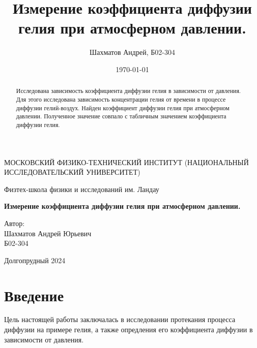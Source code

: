 \documentclass[12pt]{article}
\title{Измерение коэффициента диффузии гелия при атмосферном давлении.}
\author{Шахматов Андрей, Б02-304}
\date{\today}
\begin{document}
\begin{titlepage}
    \begin{center}
        {\large МОСКОВСКИЙ ФИЗИКО-ТЕХНИЧЕСКИЙ ИНСТИТУТ (НАЦИОНАЛЬНЫЙ ИССЛЕДОВАТЕЛЬСКИЙ УНИВЕРСИТЕТ)}
    \end{center}
    \begin{center}
        {\large Физтех-школа физики и исследований им. Ландау}
    \end{center}
    
    
    \vspace{3cm}
    {\huge
        \begin{center}
            \textbf{Измерение коэффициента диффузии гелия при атмосферном давлении.}
        \end{center}
    }
    \vspace{2cm}
    \begin{flushright}
        {\LARGE Автор:\\ Шахматов Андрей Юрьевич \\
            \vspace{0.2cm}
            Б02-304}
    \end{flushright}
    \vspace{7 cm}
    \begin{center}
        Долгопрудный 2024
    \end{center}
\end{titlepage}


\begin{abstract}
    Исследована зависимость коэффициента диффузии гелия в зависимости от давления. Для этого 
    исследована зависимость концентрации гелия от времени в процессе диффузии гелий-воздух. 
    Найден коэффициент диффузии гелия при атмосферном давлении. Полученное значение совпало с 
    табличным значением коэффициента диффузии гелия.       
\end{abstract}

\tableofcontents

\section{Введение}
Цель настоящей работы заключалась в исследовании протекания процесса диффузии на примере гелия, а также 
опредления его коэффициента диффузии в зависимости от давления.
\end{document}
